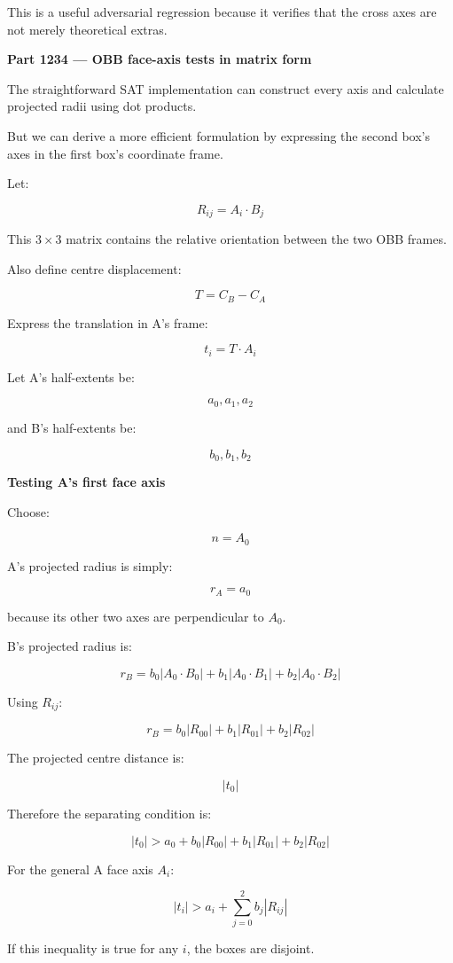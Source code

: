 This is a useful adversarial regression because it verifies that the cross axes are not merely theoretical extras.

\textbf{Part 1234 --- OBB face-axis tests in matrix form}

The straightforward SAT implementation can construct every axis and calculate projected radii using dot products.

But we can derive a more efficient formulation by expressing the second box's axes in the first box's coordinate frame.

Let:

\[
\boxed{ R_{ij}=A_i\cdot B_j }
\]

This \(3\times3\) matrix contains the relative orientation between the two OBB frames.

Also define centre displacement:

\[
T=C_B-C_A
\]

Express the translation in A's frame:

\[
\boxed{ t_i=T\cdot A_i }
\]

Let A's half-extents be:

\[
a_0,a_1,a_2
\]

and B's half-extents be:

\[
b_0,b_1,b_2
\]

\textbf{Testing A's first face axis}

Choose:

\[
n=A_0
\]

A's projected radius is simply:

\[
r_A=a_0
\]

because its other two axes are perpendicular to \(A_0\).

B's projected radius is:

\[
r_B= b_0|A_0\cdot B_0| + b_1|A_0\cdot B_1| + b_2|A_0\cdot B_2|
\]

Using \(R_{ij}\):

\[
\boxed{ r_B= b_0|R_{00}|+ b_1|R_{01}|+ b_2|R_{02}| }
\]

The projected centre distance is:

\[
|t_0|
\]

Therefore the separating condition is:

\[
\boxed{ |t_0|> a_0+b_0|R_{00}|+b_1|R_{01}|+b_2|R_{02}| }
\]

For the general A face axis \(A_i\):

\[
\boxed{ |t_i|> a_i+\sum_{j=0}^{2}b_j|R_{ij}| }
\]

If this inequality is true for any \(i\), the boxes are disjoint.

